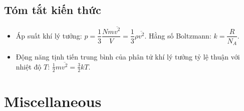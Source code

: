 \documentclass{article}
\begin{document}
\subsection{Tóm tắt kiến thức}

\begin{itemize}
	\item Áp suất khí lý tưởng: $p = \dfrac{1}{3}\dfrac{Nm\overline{v^2}}{V} = \dfrac{1}{3}\rho\overline{v^2}$. Hằng số Boltzmann: $k = \dfrac{R}{N_A}$.
	\item Động năng tịnh tiến trung bình của phân tử khí lý tưởng tỷ lệ thuận với nhiệt độ $T$: $\frac{1}{2}m\overline{v^2} = \frac{3}{2}kT$.
\end{itemize}


\section{Miscellaneous}


\printbibliography[heading=bibintoc]
	
\end{document}
